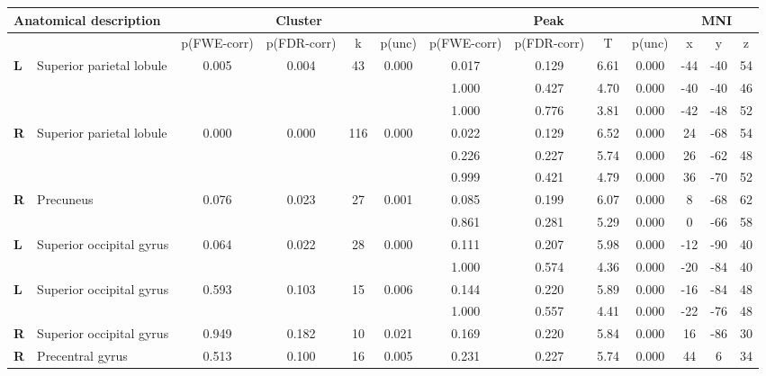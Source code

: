 \begin{landscape}
\begin{table}[!ht]
    \vspace*{-5cm}
    \raggedright
    \tiny
      \begin{tabular}{ll|cccc|cccc|ccc} \\ \hline
        \multicolumn{2}{l}{\textbf{Anatomical description}} & \multicolumn{4}{c}{\textbf{Cluster}} & \multicolumn{4}{c}{\textbf{Peak}} &  \multicolumn{3}{c}{\textbf{MNI}} \\ \hline
        \multicolumn{2}{l}{\textbf{}} & \multicolumn{1}{l}{p(FWE-corr)} & p(FDR-corr) & k & \multicolumn{1}{l}{p(unc)} & p(FWE-corr) & p(FDR-corr) & T & \multicolumn{1}{l}{p(unc)} & x & y & z \\ \hline
        \textbf{L} & Superior parietal lobule & 0.005 & 0.004 & 43 & 0.000 & 0.017 & 0.129 & 6.61 & 0.000 & -44 & -40 & 54 \\
        & & & & & & 1.000 & 0.427 & 4.70 & 0.000 & -40 & -40 & 46 \\
        & & & & & & 1.000 & 0.776 & 3.81 & 0.000 & -42 & -48 & 52 \\
        \textbf{R} & Superior parietal lobule & 0.000 & 0.000 & 116 & 0.000 & 0.022 & 0.129 & 6.52 & 0.000 & 24 & -68 & 54 \\
        & & & & & & 0.226 & 0.227 & 5.74 & 0.000 & 26 & -62 & 48 \\
        & & & & & & 0.999 & 0.421 & 4.79 & 0.000 & 36 & -70 & 52 \\
        \textbf{R} & Precuneus & 0.076 & 0.023 & 27 & 0.001 & 0.085 & 0.199 & 6.07 & 0.000 & 8 & -68 & 62 \\
        & & & & & & 0.861 & 0.281 & 5.29 & 0.000 & 0 & -66 & 58 \\
        \textbf{L} & Superior occipital gyrus & 0.064 & 0.022 & 28 & 0.000 & 0.111 & 0.207 & 5.98 & 0.000 & -12 & -90 & 40 \\
        & & & & & & 1.000 & 0.574 & 4.36 & 0.000 & -20 & -84 & 40 \\
        \textbf{L} & Superior occipital gyrus & 0.593 & 0.103 & 15 & 0.006 & 0.144 & 0.220 & 5.89 & 0.000 & -16 & -84 & 48 \\
        & & & & & & 1.000 & 0.557 & 4.41 & 0.000 & -22 & -76 & 48 \\
        \textbf{R} & Superior occipital gyrus & 0.949 & 0.182 & 10 & 0.021 & 0.169 & 0.220 & 5.84 & 0.000 & 16 & -86 & 30 \\
        \textbf{R} & Precentral gyrus & 0.513 & 0.100 & 16 & 0.005 & 0.231 & 0.227 & 5.74 & 0.000 & 44 & 6 & 34 \\

\end{tabular}
\end{table}
\end{landscape}
